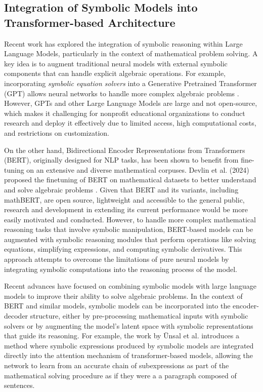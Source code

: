 \documentclass{article}
\begin{document}
\subsection{Integration of Symbolic Models into Transformer-based Architecture}

Recent work has explored the integration of symbolic reasoning within Large Language Models, particularly in the context of mathematical problem solving. A key idea is to augment traditional neural models with external symbolic components that can handle explicit algebraic operations. For example, incorporating \textit{symbolic equation solvers} into a Generative Pretrained Transformer (GPT) allows neural networks to handle more complex algebraic problems \cite{Hu2022Enhancing}. However, GPTs and other Large Language Models are large and not open-source, which makes it challenging for nonprofit educational organizations to conduct research and deploy it effectively due to limited access, high computational costs, and restrictions on customization.

On the other hand, Bidirectional Encoder Representations from Transformers (BERT), originally designed for NLP tasks, has been shown to benefit from fine-tuning on an extensive and diverse mathematical corpuses. Devlin et al. (2024) proposed the finetuning of BERT on mathematical datasets to better understand and solve algebraic problems \cite{mathBERT}. Given that BERT and its variants, including mathBERT, are open source, lightweight and accessible to the general public, research and development in extending its current performance would be more easily motivated and conducted. However, to handle more complex mathematical reasoning tasks that involve symbolic manipulation, BERT-based models can be augmented with symbolic reasoning modules that perform operations like solving equations, simplifying expressions, and computing symbolic derivatives. This approach attempts to overcome the limitations of pure neural models by integrating symbolic computations into the reasoning process of the model. 

Recent advances have focused on combining symbolic models with large language models to improve their ability to solve algebraic problems. In the context of BERT and similar models, symbolic models can be incorporated into the encoder-decoder structure, either by pre-processing mathematical inputs with symbolic solvers or by augmenting the model's latent space with symbolic representations that guide its reasoning. For example, the work by Ünsal et al. \cite{Unsal_Gehr_Vechev_2024} introduces a method where symbolic expressions produced by symbolic models are integrated directly into the attention mechanism of transformer-based models, allowing the network to learn from an accurate chain of subexpressions as part of the mathematical solving procedure as if they were a a paragraph composed of sentences.
\end{document}
